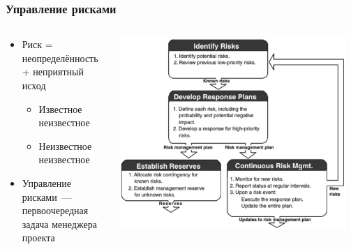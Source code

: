 \documentclass{../../slides-style}
\begin{document}
    \begin{frame}
        \frametitle{Управление рисками}
        \begin{columns}
            \begin{column}{0.4\textwidth}
                \begin{itemize}
                    \item Риск = неопределённость + неприятный исход
                    \begin{itemize}
                        \item Известное неизвестное
                        \item Неизвестное неизвестное
                    \end{itemize}
                    \item Управление рисками~--- первоочередная задача менеджера проекта
                \end{itemize}
            \end{column}
            \begin{column}{0.6\textwidth}
                \begin{center}
                    \includegraphics[width=0.95\textwidth]{riskManagementLoop.png}
                \end{center}
            \end{column}
        \end{columns}
    \end{frame}
\end{document}

